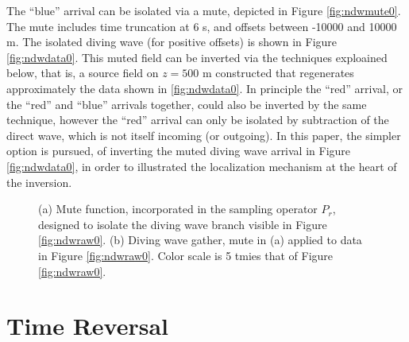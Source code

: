 \documentclass[12pt]{geophysics}
\begin{document}
The ``blue'' arrival can be  isolated via a mute, depicted in Figure
\ref{fig:ndwmute0}.  The
mute includes time truncation at 6 s, and offsets between -10000 and
10000 m. The isolated
diving wave (for positive offsets) is shown in
Figure \ref{fig:ndwdata0}. This muted field can be inverted via the
techniques exploained below, that is, a source field on $z=500$ m
constructed that regenerates approximately the data shown in
\ref{fig:ndwdata0}. In principle the ``red'' arrival, or the ``red''
and ``blue'' arrivals together, could also be inverted by the same
technique, however the ``red'' arrival can only be isolated by
subtraction of the direct wave, which is not itself incoming (or
outgoing). In this paper, the simpler option is pursued, of inverting
the muted diving wave arrival in Figure \ref{fig:ndwdata0}, in order
to illustrated the localization mechanism at the heart of the inversion.

\begin{figure}
  \centering
  \caption{(a) Mute function,
    incorporated in the sampling operator $P_r$, designed to isolate
    the diving wave branch visible in Figure \ref{fig:ndwraw0}. (b) Diving wave
    gather, mute in (a) applied to data in Figure
    \ref{fig:ndwraw0}. Color scale is 5 tmies that of Figure \ref{fig:ndwraw0}.}
\end{figure}

\section{Time Reversal}
\end{document}
